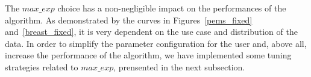 The $max\_exp$ choice has a non-negligible impact on the performances of the algorithm. As demonstrated by the curves in Figures~\ref{pems_fixed} and~\ref{breast_fixed}, it is very dependent on the use case and distribution of the data. In order to simplify the parameter configuration for the user and, above all, increase the performance of the algorithm, we have implemented some tuning strategies related to $max\_exp$, prensented in the next subsection.
%
%
%
%
%
%
